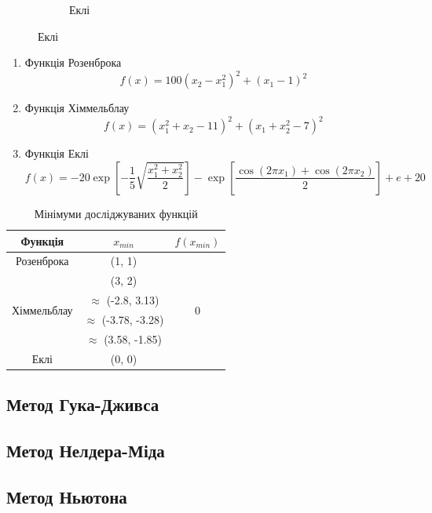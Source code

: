 \begin{figure}[h!]
\begin{subfigure}{0.3 \textwidth}
        \caption{Еклі}
    \end{subfigure}
\end{figure}

\begin{enumerate}
    \item Функція Розенброка
    $$ f(x) = 100(x_2-x_1^2)^2 + (x_1-1)^2 $$
    \item Функція Хіммельблау
    $$ f(x) = (x_1^2 + x_2 - 11)^2 + (x_1 + x_2^2 - 7)^2 $$
    \item Функція Еклі
    $$ f(x) = -20 \exp{\left[-\frac{1}{5} \sqrt{\frac{x_1^2 + x_2^2}{2}}\right]} -
    \exp{\left[\frac{\cos(2 \pi x_1) + \cos(2 \pi x_2)}{2}\right]} + e + 20 $$
\end{enumerate}

\clearpage
\begin{table}[h!]
    \centering
    \begin{tabular}{|c|c|c|}
        \hline
        Функція & $x_{min}$ & $f(x_{min})$ \\
        \hline
        Розенброка & (1, 1) &
        \multirow{6}{*}{0} \\ \cline{1-2}

        \multirow{4}{*}{Хіммельблау} &
        (3, 2) & \\ \cline{2-2}
        & $\approx$ (-2.8, 3.13) &  \\ \cline{2-2}
        & $\approx$ (-3.78, -3.28) &  \\ \cline{2-2}
        & $\approx$ (3.58, -1.85) &  \\ \cline{1-2}

        Еклі & (0, 0) & \\
        \hline
    \end{tabular}
    \caption{Мінімуми досліджуваних функцій}
\end{table}

\subsection*{Метод Гука-Дживса}

\subsection*{Метод Нелдера-Міда}

\subsection*{Метод Ньютона}

